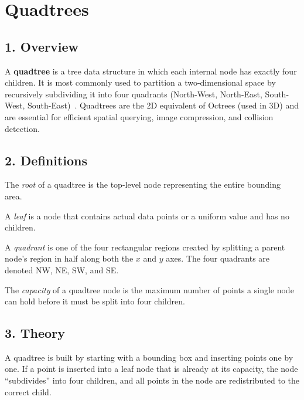 \section{Quadtrees}
\label{sec:quadtree}

\subsection{1. Overview}
A \textbf{quadtree} is a tree data structure in which each internal node has exactly four children. It is most commonly used to partition a two-dimensional space by recursively subdividing it into four quadrants (North-West, North-East, South-West, South-East)~\cite{finkel1974}. Quadtrees are the 2D equivalent of Octrees (used in 3D) and are essential for efficient spatial querying, image compression, and collision detection.

\subsection{2. Definitions}
\begin{definition}
\label{def:qt_root}
The \emph{root} of a quadtree is the top-level node representing the entire bounding area.
\end{definition}

\begin{definition}
\label{def:qt_leaf}
A \emph{leaf} is a node that contains actual data points or a uniform value and has no children.
\end{definition}

\begin{definition}[Quadrant]
\label{def:qt_quadrant}
A \emph{quadrant} is one of the four rectangular regions created by splitting a parent node's region in half along both the $x$ and $y$ axes. The four quadrants are denoted NW, NE, SW, and SE.
\end{definition}

\begin{definition}
\label{def:qt_capacity}
The \emph{capacity} of a quadtree node is the maximum number of points a single node can hold before it must be split into four children.
\end{definition}

\subsection{3. Theory}
A quadtree is built by starting with a bounding box and inserting points one by one. If a point is inserted into a leaf node that is already at its capacity, the node ``subdivides'' into four children, and all points in the node are redistributed to the correct child.


